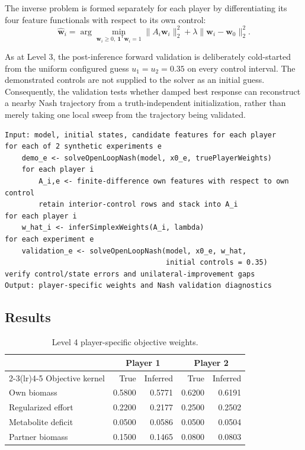 \documentclass[11pt,a4paper]{article}
\newcommand{\vect}[1]{\boldsymbol{#1}}
\begin{document}
The inverse problem is formed separately for each player by differentiating
its four feature functionals with respect to its own control:
\begin{equation}
  \hat{\vect{w}}_i =
  \arg\min_{\vect{w}_i\ge0,\
             \vect{1}^{\mathsf T}\vect{w}_i=1}
  \|A_i\vect{w}_i\|_2^2
  +\lambda\|\vect{w}_i-\vect{w}_0\|_2^2.
\end{equation}

As at Level 3, the post-inference forward validation is deliberately
cold-started from the uniform configured guess \(u_1=u_2=0.35\) on every
control interval. The demonstrated controls are not supplied to the solver as
an initial guess. Consequently, the validation tests whether damped best
response can reconstruct a nearby Nash trajectory from a truth-independent
initialization, rather than merely taking one local sweep from the trajectory
being validated.

\noindent\begin{minipage}{\linewidth}
\begin{lstlisting}[style=pseudostyle,title={Compact MATLAB pseudocode}]
Input: model, initial states, candidate features for each player
for each of 2 synthetic experiments e
    demo_e <- solveOpenLoopNash(model, x0_e, truePlayerWeights)
    for each player i
        A_i,e <- finite-difference own features with respect to own control
        retain interior-control rows and stack into A_i
for each player i
    w_hat_i <- inferSimplexWeights(A_i, lambda)
for each experiment e
    validation_e <- solveOpenLoopNash(model, x0_e, w_hat,
                                      initial controls = 0.35)
verify control/state errors and unilateral-improvement gaps
Output: player-specific weights and Nash validation diagnostics
\end{lstlisting}
\end{minipage}

\subsection{Results}

\begin{table}[H]
\centering
\caption{Level 4 player-specific objective weights.}
\label{tab:level4}
\begin{tabular}{lrrrr}
\toprule
& \multicolumn{2}{c}{Player 1} & \multicolumn{2}{c}{Player 2}\\
\cmidrule(lr){2-3}\cmidrule(lr){4-5}
Objective kernel & True & Inferred & True & Inferred\\
\midrule
Own biomass & 0.5800 & 0.5771 & 0.6200 & 0.6191\\
Regularized effort & 0.2200 & 0.2177 & 0.2500 & 0.2502\\
Metabolite deficit & 0.0500 & 0.0586 & 0.0500 & 0.0504\\
Partner biomass & 0.1500 & 0.1465 & 0.0800 & 0.0803\\
\bottomrule
\end{tabular}
\end{table}
\end{document}
